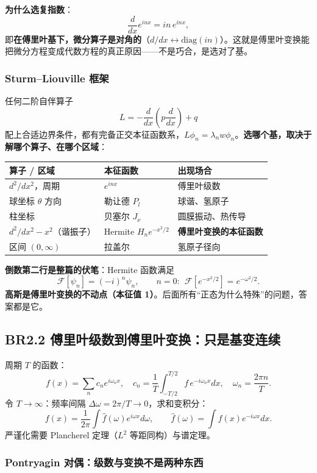 \textbf{为什么选复指数}：
\[
\frac{d}{dx}e^{inx}=in\,e^{inx},
\]
即\textbf{在傅里叶基下，微分算子是对角的}（$d/dx\leftrightarrow\mathrm{diag}(in)$）。这就是傅里叶变换能把微分方程变成代数方程的真正原因——不是巧合，是选对了基。

\subsubsection{Sturm--Liouville 框架}

任何二阶自伴算子
\[
L=-\frac{d}{dx}\left(p\frac{d}{dx}\right)+q
\]
配上合适边界条件，都有完备正交本征函数系，$L\phi_n=\lambda_n w\phi_n$。\textbf{选哪个基，取决于解哪个算子、在哪个区域}：

\begin{center}
\begin{tabular}{L{4.2cm}L{3.2cm}L{4.5cm}}
\toprule
\textbf{算子 / 区域} & \textbf{本征函数} & \textbf{出现场合} \\
\midrule
$d^2/dx^2$，周期 & $e^{inx}$ & 傅里叶级数 \\
球坐标 $\theta$ 方向 & 勒让德 $P_l$ & 球谐、氢原子 \\
柱坐标 & 贝塞尔 $J_\nu$ & 圆膜振动、热传导 \\
$d^2/dx^2-x^2$（谐振子） & Hermite $H_ne^{-x^2/2}$ & \textbf{傅里叶变换的本征函数} \\
区间 $(0,\infty)$ & 拉盖尔 & 氢原子径向 \\
\bottomrule
\end{tabular}
\end{center}

\textbf{倒数第二行是整篇的伏笔}：Hermite 函数满足
\[
\mathcal{F}[\psi_n]=(-i)^n\psi_n,\qquad n=0:\ \ \mathcal{F}\left[e^{-x^2/2}\right]=e^{-\omega^2/2}.
\]
\textbf{高斯是傅里叶变换的不动点（本征值 1）}。后面所有“正态为什么特殊”的问题，答案都是它。

\subsection{BR2.2 傅里叶级数到傅里叶变换：只是基变连续}

周期 $T$ 的函数：
\[
f(x)=\sum_n c_ne^{i\omega_n x},\quad
c_n=\frac1T\int_{-T/2}^{T/2}f\,e^{-i\omega_n x}dx,\quad
\omega_n=\frac{2\pi n}{T}.
\]
令 $T\to\infty$：频率间隔 $\Delta\omega=2\pi/T\to 0$，求和变积分：
\[
f(x)=\frac{1}{2\pi}\int\hat f(\omega)e^{i\omega x}d\omega,\qquad
\hat f(\omega)=\int f(x)e^{-i\omega x}dx .
\]
严谨化需要 Plancherel 定理（$L^2$ 等距同构）与谱定理。

\subsubsection{Pontryagin 对偶：级数与变换不是两种东西}

